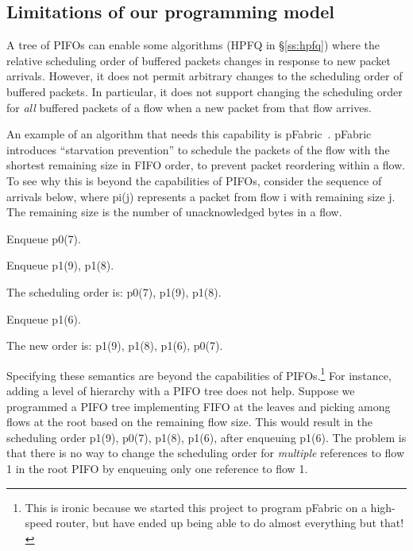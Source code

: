\subsection{Limitations of our programming model}
\label{pifo_ss:limitations}

A tree of PIFOs can enable some algorithms (\eg HPFQ in \S\ref{ss:hpfq}) where
the relative scheduling order of buffered packets changes in response to new
packet arrivals. However, it does not permit arbitrary changes to the
scheduling order of buffered packets. In particular, it does not support
changing the scheduling order for {\em all} buffered packets of a flow when a
new packet from that flow arrives.

An example of an algorithm that needs this capability is
pFabric~\cite{pFabric}. pFabric introduces ``starvation prevention'' to
schedule the packets of the flow with the shortest remaining size in FIFO
order, to prevent packet reordering within a flow. To see why this is beyond
the capabilities of PIFOs, consider the sequence of arrivals below, where pi(j)
represents a packet from flow i with remaining size j. The remaining size
is the number of unacknowledged bytes in a flow.
\begin{CompactEnumerate}
\item Enqueue p0(7).
\item Enqueue p1(9), p1(8).
\item The scheduling order is: p0(7), p1(9), p1(8).
\item Enqueue p1(6).
\item The new order is: p1(9), p1(8), p1(6), p0(7).
\end{CompactEnumerate}

Specifying these semantics are beyond the capabilities of PIFOs.\footnote{This
is ironic because we started this project to program pFabric on a high-speed
router, but have ended up being able to do almost everything but that!} For
instance, adding a level of hierarchy with a PIFO tree does not help. Suppose
we programmed a PIFO tree implementing FIFO at the leaves and picking among
flows at the root based on the remaining flow size. This would result in the
scheduling order p1(9), p0(7), p1(8), p1(6), after enqueuing p1(6). The problem
is that there is no way to change the scheduling order for {\em multiple}
references to flow 1 in the root PIFO by enqueuing only one reference to flow
1.

